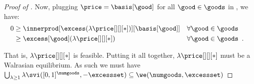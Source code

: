 \begin{proof}[Proof of ]
    Now, plugging $\price = \basis[\good]$ for all $\good \in \goods$ in , we have:
    \begin{align*}
        0 &\geq \innerprod[{\excess(\lambda \price[][][*])}][{\basis[\good]}] && \forall \good \in \goods \notag\\
        &\geq \excess[\good](\lambda \price[][][*]) && \forall \good \in \goods \notag \enspace .
    \end{align*}

   That is, $\lambda \price[][][*]$ is feasible. Putting it all together, $\lambda \price[][][*]$ must be a Walrasian equilibrium. As such we must have $ \bigcup_{\lambda \geq 1} \lambda \svi([0, 1]^\numgoods, -\excessset) \subseteq \we(\numgoods, \excessset)$
\end{proof}




